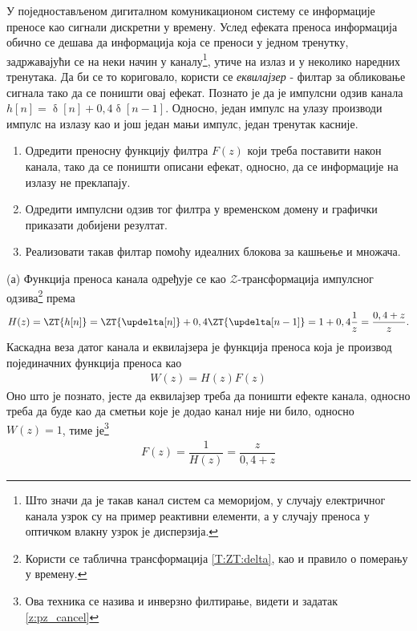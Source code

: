 \PID
У поједностављеном дигиталном комуникационом систему се информације преносе као сигнали дискретни у времену. 
Услед ефеката преноса информација обично се дешава да информација која се 
преноси у једном тренутку, задржавајући се на неки начин у каналу\footnote{Што значи да је такав канал систем са меморијом, у случају 
електричног канала узрок су на пример реактивни елементи, а у случају преноса у оптичком влакну узрок је дисперзија.}, утиче на излаз и у неколико наредних 
тренутака. Да би се то кориговало, користи се \textit{еквилајзер} - филтар за обликовање сигнала тако да се поништи овај ефекат. Познато је да је импулсни
одзив канала $h[n] = \updelta[n] + 0,4 \updelta[n-1]$. Односно, један импулс на улазу производи импулс на излазу као и још један мањи импулс, један 
тренутак касније. 
\begin{enumerate}[label=(\alph*)]
\item Одредити преносну функцију филтра $F(z)$ који треба поставити након канала, тако да се поништи описани ефекат, односно, да се информације на 
излазу не преклапају. 
\item Одредити импулсни одзив тог филтра у временском домену и графички приказати добијени резултат. 
\item Реализовати такав филтар помоћу идеалних блокова за кашњење и множача. 
\end{enumerate}

\RESENJE
(а) Функција преноса канала одређује се као $\mathcal{Z}$-трансформација импулсног одзива\footnote{
    Користи се таблична трансформација \ref{T:ZT:delta}, као и правило о померању у времену. 
} према 
\begin{eqnarray}
    H(z) = \ZT{h[n]} = \ZT{\updelta[n]} + 0,4 \ZT{\updelta[n-1]} 
                     = 1 + 0,4\dfrac{1}{z} = \dfrac{0,4 + z}{z}.
\end{eqnarray}
Каскадна веза датог канала и еквилајзера је функција преноса која је производ појединачних функција преноса као 
\begin{eqnarray}
    W(z) = H(z) F(z)
\end{eqnarray}
Оно што је познато, јесте да еквилајзер треба да поништи ефекте канала, односно треба да буде као да сметњи које је додао канал није ни било, 
односно $W(z) = 1$, тиме је\footnote{Ова техника се назива и инверзно филтирање, видети и задатак \ref{z:pz_cancel}}
\begin{eqnarray}
    F(z) = \dfrac{1}{H(z)} = \dfrac{z}{0,4 + z}
\end{eqnarray}


